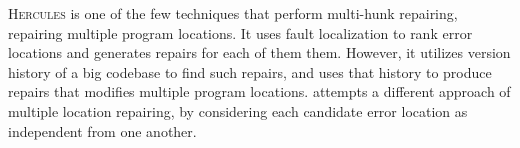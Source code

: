 


\textsc{Hercules} \citep{Saha_2019} is one of the few techniques that perform
multi-hunk repairing, \ie repairing multiple program locations. It uses fault
localization to rank error locations and generates repairs for each of them
them. However, it utilizes version history of a big codebase to find such
repairs, and uses that history to produce repairs that modifies multiple program
locations. \toolname attempts a different approach of multiple location
repairing, by considering each candidate error location as independent from one
another.
